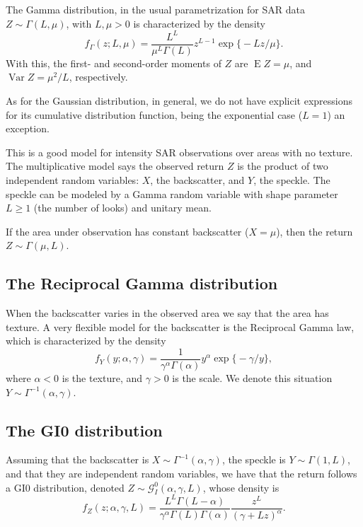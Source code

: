 The Gamma distribution, in the usual parametrization for SAR data $Z\sim\Gamma(L,\mu)$, with $L,\mu>0$ is characterized by the density
\begin{equation}
f_\Gamma(z;L,\mu) = \frac{L^L}{\mu^{L}\Gamma(L)} z^{L-1} 
	\exp\big\{ -L z / \mu
	\big\}.
\label{eq:SARGammaDensity}
\end{equation}
With this, the first- and second-order moments of $Z$ are
$\operatorname{E}Z=\mu$,
and 
$\operatorname{Var}Z=\mu^2/L$,
respectively.

As for the Gaussian distribution, in general, we do not have explicit expressions for its cumulative distribution function, being the exponential case ($L=1$) an exception.

This is a good model for intensity SAR observations over areas with no texture.
The multiplicative model says the observed return $Z$ is the product of two independent random variables:
$X$, the backscatter, and
$Y$, the speckle.
The speckle can be modeled by a Gamma random variable with shape parameter $L\geq1$ (the number of looks) and unitary mean.

If the area under observation has constant backscatter ($X=\mu$), then the return $Z\sim\Gamma(\mu,L)$.

\subsection{The Reciprocal Gamma distribution}

When the backscatter varies in the observed area we say that the area has texture.
A very flexible model for the backscatter is the Reciprocal Gamma law\cite{frery96}, which is characterized by the density
\begin{equation}
f_Y(y;\alpha,\gamma)= \frac{1}{\gamma^\alpha \Gamma(\alpha)}
y^\alpha \exp\big\{-\gamma/y\big\},
\label{eq:IGDensity}
\end{equation}
where $\alpha<0$ is the texture, and
$\gamma>0$ is the scale.
We denote this situation $Y\sim \Gamma^{-1}(\alpha,\gamma)$.

\subsection{The GI0 distribution}

Assuming that the backscatter is $X\sim\Gamma^{-1}(\alpha,\gamma)$,
the speckle is $Y\sim\Gamma(1,L)$, and that they are independent random variables, we have that the return follows a GI0 distribution\cite{GeodesicDistanceGI0JSTARS,ParameterEstimationSARStochasticDistancesKernels}, denoted $Z\sim\mathcal G_I^0(\alpha,\gamma,L)$, whose density is
\begin{equation}
f_Z(z;\alpha,\gamma,L) = \frac{L^L \Gamma(L-\alpha)}{\gamma^\alpha \Gamma(L) \Gamma(\alpha)}
\frac{z^L}{(\gamma+Lz)^\alpha}.
\end{equation}

